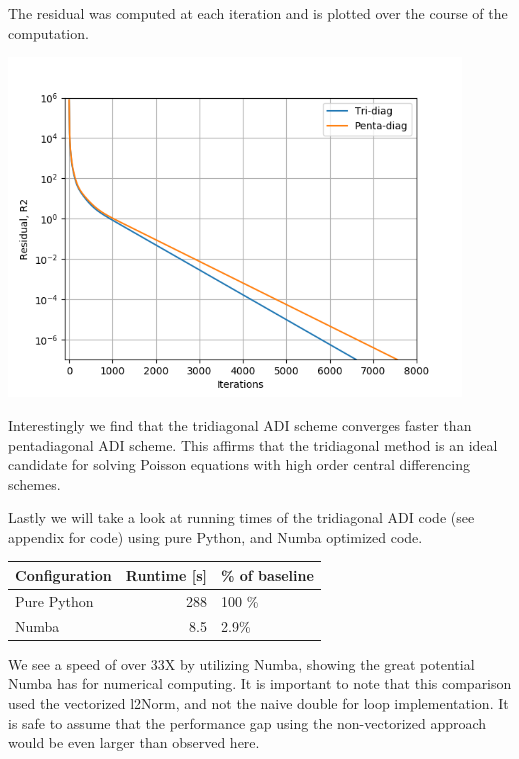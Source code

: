 \documentclass[11pt]{article}
\begin{document}
The residual was computed at each iteration and is plotted over the course of the computation.

\includegraphics[width=12cm]{./figures/residual.png}

Interestingly we find that the tridiagonal ADI scheme converges faster than pentadiagonal ADI scheme. This affirms that the tridiagonal method is an ideal candidate for solving Poisson equations with high order central differencing schemes.

Lastly we will take a look at running times of the tridiagonal ADI code (see appendix for code) using pure Python, and Numba optimized code.

\begin{center}
\begin{tabular}{lrl}
\hline
Configuration & Runtime [s] & \% of baseline\\
\hline
Pure Python & 288 & 100 \%\\
Numba & 8.5 & 2.9\%\\
\hline
\end{tabular}
\end{center}
We see a speed of over 33X by utilizing Numba, showing the great potential Numba has for numerical computing.
It is important to note that this comparison used the vectorized l2Norm, and not the naive double for loop implementation. It is safe to assume that the performance gap using the non-vectorized approach would be even larger than observed here.

\newpage
\end{document}
